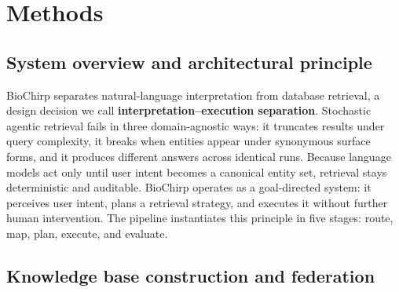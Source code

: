 
\section*{Methods}

\subsection*{System overview and architectural principle}

BioChirp separates natural-language interpretation from database retrieval, a design decision we call \textbf{interpretation--execution separation}. Stochastic agentic retrieval fails in three domain-agnostic ways: it truncates results under query complexity, it breaks when entities appear under synonymous surface forms, and it produces different answers across identical runs. Because language models act only until user intent becomes a canonical entity set, retrieval stays deterministic and auditable. BioChirp operates as a goal-directed system: it perceives user intent, plans a retrieval strategy, and executes it without further human intervention. The pipeline instantiates this principle in five stages: route, map, plan, execute, and evaluate.

\subsection*{Knowledge base construction and federation}

